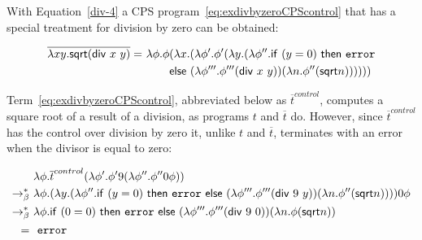 With Equation~\eqref{div-4} a CPS program~\eqref{eq:exdivbyzeroCPScontrol} that has a special treatment for division by zero can be obtained:
%
\begin{example}
\begin{align}
 \overline{\lambda xy. \mathsf{sqrt} (\mathsf{div} \ x \ y)} 
  = \ & \lambda \phi. \phi ( \lambda x. ( \lambda \phi'. \phi' ( \lambda y. ( \lambda \phi''.    \mathsf{if} \ (y = 0)  \ \mathsf{then} \ \mathtt{error}  \notag \\
  & \phantom{\lambda \phi. \phi   }
   \mathsf{else}  \  (\lambda \phi'''. \phi''' (\mathsf{div} \ x \ y) )  (\lambda n.  \phi''(  \mathsf{sqrt}  n)) ) ))) \label{eq:exdivbyzeroCPScontrol} 
\end{align} \qex
\end{example}

%
Term~\eqref{eq:exdivbyzeroCPScontrol}, abbreviated below as $\overline{t}^{control}$, computes a square root of a result of a division, as programs $t$ and $\overline{t}$ do. However, since $\overline{t}^{control}$ has the control over division by zero it, unlike $t$ and $\overline{t}$, terminates with an error when the divisor is equal to zero:
%
\begin{example} \label{ex:CPScontrolfinal}
\begin{align}
& \lambda \phi. \overline{t}^{control} (\lambda \phi'. \phi' 9 (\lambda \phi''. \phi'' 0 \phi)) \notag \\
  \bred \ & \lambda \phi.   ( \lambda y. ( \lambda \phi''.    \mathsf{if} \ (y = 0)  \ \mathsf{then} \ \mathtt{error} \ \mathsf{else}  \  (\lambda \phi'''. \phi''' (\mathsf{div} \ 9 \ y) )  (\lambda n.  \phi''(  \mathsf{sqrt}  n)) ) ) 0 \phi \notag \\
    \bred \ & \lambda \phi. \mathsf{if} \ (0 = 0)  \ \mathsf{then} \ \mathtt{error} \ \mathsf{else}  \  (\lambda \phi'''. \phi''' (\mathsf{div} \ 9 \ 0) )  (\lambda n.  \phi(  \mathsf{sqrt}  n))  \notag \\
=  \ & \ \mathtt{error} \notag %
\end{align} \qex
\end{example}

